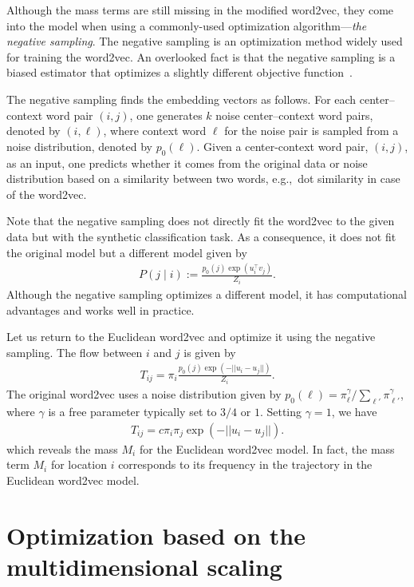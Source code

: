 \documentclass[12pt]{article} %
\def\given{\mid}
\def\eg{e.g.,~}
\begin{document}
Although the mass terms are still missing in the modified word2vec, they come into the model when using a commonly-used optimization algorithm---\emph{the negative sampling}.
The negative sampling is an optimization method widely used for training the word2vec.
An overlooked fact is that the negative sampling is a biased estimator that optimizes a slightly different objective function~\cite{Gutmann2010}.

The negative sampling finds the embedding vectors as follows.
For each center--context word pair $(i,j)$, one generates $k$ noise center--context word pairs, denoted by $(i, \ell)$, where context word $\ell$ for the noise pair is sampled from a noise distribution, denoted by $p_{0}(\ell)$.
Given a center-context word pair, $(i,j)$, as an input, one predicts whether it comes from the original data or noise distribution based on
a similarity between two words, \eg dot similarity in case of the word2vec.

Note that the negative sampling does not directly fit the word2vec to the given data but with the synthetic classification task.
As a consequence, it does not fit the original model but a different model given by \cite{Gutmann2010}
\begin{align}
    P\left(j \given i \right):= \frac{p_0(j)\exp(u^\top _i v_j)}{Z_i}.
\end{align}
Although the negative sampling optimizes a different model, it has computational advantages and works well in practice.

Let us return to the Euclidean word2vec and optimize it using the negative sampling.
The flow between $i$ and $j$ is given by
\begin{align}
    T_{ij}=\pi_i\frac{p_0(j)\exp(-||u_i - u_j||)}{Z_i}.
\end{align}
The original word2vec uses a noise distribution given by $p_{0}(\ell) = \pi^{\gamma} _\ell / \sum_{\ell'} \pi^{\gamma}_{\ell'}$, where $\gamma$ is a free parameter typically set to $3/4$ or $1$.
Setting $\gamma=1$, we have
\begin{align}
    T_{ij}=c\pi_i \pi_j\exp(-||u_i - u_j||). \label{eq:flow_w2v_ng}
\end{align}
which reveals the mass $M_i$ for the Euclidean word2vec model.
In fact, the mass term $M_i$ for location $i$ corresponds to its frequency in the trajectory in the Euclidean word2vec model.


\section{Optimization based on the multidimensional scaling}
\end{document}
